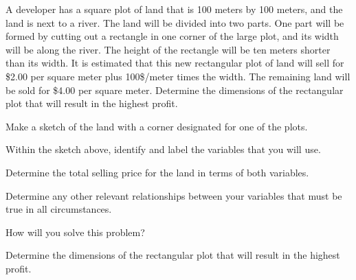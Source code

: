 \begin{problem}
  \clearpage

\item A developer has a square plot of land that is 100 meters by 100
  meters, and the land is next to a river. The land will be divided
  into two parts. One part will be formed by cutting out a rectangle
  in one corner of the large plot, and its width will be along the
  river. The height of the rectangle will be ten meters shorter than
  its width.  It is estimated that this new rectangular plot of land
  will sell for \$2.00 per square meter plus 100\$/meter times the
  width. The remaining land will be sold for \$4.00 per square meter.
  Determine the dimensions of the rectangular plot that will result in
  the highest profit.

    \begin{subproblem}
      \item Make a sketch of the land with a corner designated for one
        of the plots.
        \vfill
      \item Within the sketch above, identify and label the variables
        that you will use.
      \item Determine the total selling price for the land in terms of
        both variables.  
        
        \vfill

        \clearpage

      \item Determine any other relevant relationships between your
        variables that must be true in all circumstances.
        \vfill
      \item How will you solve this problem?
        \vspace{2em}
      \item Determine the dimensions of the rectangular plot that will
        result in the highest profit.
        \vfill
        \vfill
    \end{subproblem}

\end{problem}

\postClass

